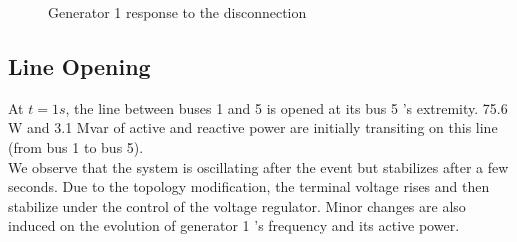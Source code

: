 \documentclass[a4paper, 12pt]{report}
\begin{document}
\begin{figure}[H]
\caption{Generator 1 response to the disconnection}
\end{figure}

\newpage
\subsection{Line Opening}
\label{DisconnectLine}

At $t=1s$, the line between buses 1 and 5 is opened at its bus 5 's extremity. 75.6 W and 3.1 Mvar of active and reactive power are initially transiting on this line (from bus 1 to bus 5).\\

We observe that the system is oscillating after the event but stabilizes after a few seconds. Due to the topology modification, the terminal voltage rises and then stabilize under the control of the voltage regulator. Minor changes are also induced on the evolution of generator 1 's frequency and its active power.\\
\end{document}
